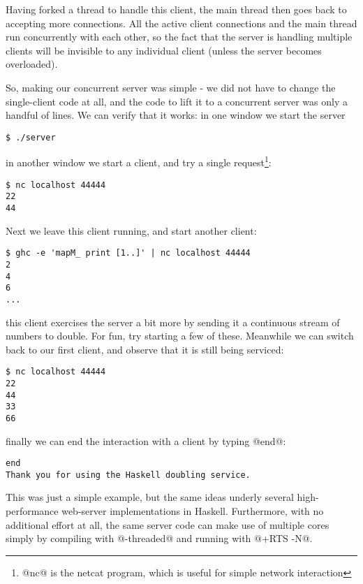 Having forked a thread to handle this client, the main thread then
goes back to accepting more connections.  All the active client
connections and the main thread run concurrently with each other, so
the fact that the server is handling multiple clients will be
invisible to any individual client (unless the server becomes
overloaded).

So, making our concurrent server was simple - we did not have to
change the single-client code at all, and the code to lift it to a
concurrent server was only a handful of lines.  We can verify that it
works: in one window we start the server

\begin{verbatim}
$ ./server
\end{verbatim}

\noindent in another window we start a client, and try a single
request\footnote{@nc@ is the netcat program, which is useful for simple network
  interaction}:

\begin{verbatim}
$ nc localhost 44444
22
44
\end{verbatim}

\noindent Next we leave this client running, and start another client:

\begin{verbatim}
$ ghc -e 'mapM_ print [1..]' | nc localhost 44444
2
4
6
...
\end{verbatim}

\noindent this client exercises the server a bit more by sending it a
continuous stream of numbers to double.  For fun, try starting a few
of these.  Meanwhile we can switch back to our first client, and
observe that it is still being serviced:

\begin{verbatim}
$ nc localhost 44444
22
44
33
66
\end{verbatim}

\noindent finally we can end the interaction with a client by typing
@end@:

\begin{verbatim}
end
Thank you for using the Haskell doubling service.
\end{verbatim}

This was just a simple example, but the same ideas underly several
high-performance web-server implementations in Haskell.  Furthermore,
with no additional effort at all, the same server code can make use of
multiple cores simply by compiling with @-threaded@ and running with
@+RTS -N@.

